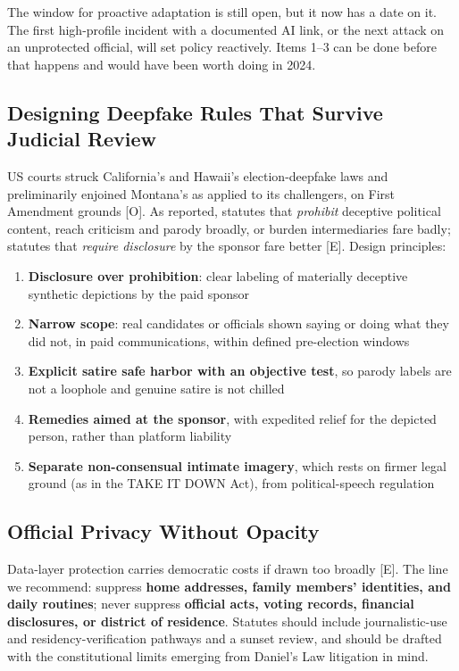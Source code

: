 \documentclass[11pt,letterpaper]{article}
\makeatletter
\newcommand{\etraneed}[1]{\par\if@nobreak\else\penalty\z@\ifdim\pagegoal<\maxdimen\ifdim\dimexpr\pagegoal-\pagetotal\relax<\dimexpr#1\relax\newpage\fi\fi\fi}
\makeatother
\begin{document}
\etraneed{6\baselineskip}
\begin{keybox}
The window for proactive adaptation is still open, but it now has a date on it. The first high-profile incident with a documented AI link, or the next attack on an unprotected official, will set policy reactively. Items 1--3 can be done before that happens and would have been worth doing in 2024.
\end{keybox}

\subsection{Designing Deepfake Rules That Survive Judicial Review}

US courts struck California's and Hawaii's election-deepfake laws and preliminarily enjoined Montana's as applied to its challengers, on First Amendment grounds [O]. As reported, statutes that \textit{prohibit} deceptive political content, reach criticism and parody broadly, or burden intermediaries fare badly; statutes that \textit{require disclosure} by the sponsor fare better [E]. Design principles:
\begin{enumerate}
  \item \textbf{Disclosure over prohibition}: clear labeling of materially deceptive synthetic depictions by the paid sponsor
  \item \textbf{Narrow scope}: real candidates or officials shown saying or doing what they did not, in paid communications, within defined pre-election windows
  \item \textbf{Explicit satire safe harbor with an objective test}, so parody labels are not a loophole and genuine satire is not chilled
  \item \textbf{Remedies aimed at the sponsor}, with expedited relief for the depicted person, rather than platform liability
  \item \textbf{Separate non-consensual intimate imagery}, which rests on firmer legal ground (as in the TAKE IT DOWN Act), from political-speech regulation
\end{enumerate}

\subsection{Official Privacy Without Opacity}

Data-layer protection carries democratic costs if drawn too broadly [E]. The line we recommend: suppress \textbf{home addresses, family members' identities, and daily routines}; never suppress \textbf{official acts, voting records, financial disclosures, or district of residence}. Statutes should include journalistic-use and residency-verification pathways and a sunset review, and should be drafted with the constitutional limits emerging from Daniel's Law litigation in mind.
\end{document}
